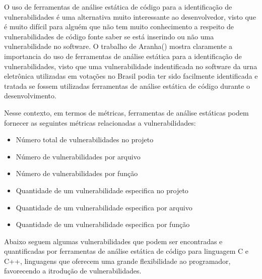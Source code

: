 O uso de ferramentas de análise estática de código para a identificação de vulnerabilidades é uma alternativa muito interessante ao desenvolvedor, visto que é muito difícil para alguém que não tem muito conhecimento a respeito de vulnerabilidades de código fonte saber se está inserindo ou não uma vulnerabilidade no software. O trabalho de Aranha(\citeyear{aranha2012}) mostra claramente a importancia do uso de ferramentas de análise estática para a identificação de vulnerabilidades, visto que uma vulnerabilidade indentificada no software da urna eletrônica utilizadas em votações no Brasil podia ter sido facilmente identificada e tratada se fossem utilizadas ferramentas de análise estática de código durante o desenvolvimento.

%

Nesse contexto, em termos de métricas, ferramentas de análise estáticas podem fornecer as seguintes métricas relacionadas a vulnerabilidades:

\begin{itemize}
\item Número total de vulnerabilidades no projeto
\item Número de vulnerabilidades por arquivo
\item Número de vulnerabilidades por função
\item Quantidade de um vulnerabilidade especifica no projeto
\item Quantidade de um vulnerabilidade especifica por arquivo
\item Quantidade de um vulnerabilidade especifica por função
\end{itemize}

%
Abaixo seguem algumas vulnerabilidades que podem ser encontradas e quantificadas	 por ferramentas de análise estática de código para linguagem C e C++, linguagens que oferecem uma grande flexibilidade ao programador, favorecendo a itrodução de vulnerabilidades.

